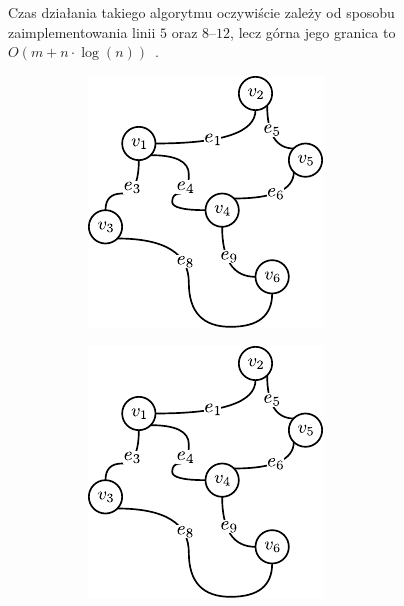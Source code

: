 Czas działania takiego algorytmu oczywiście zależy od sposobu zaimplementowania linii $5$ oraz $8$--$12$, lecz górna jego granica to $O \left( m + n \cdot \log \left( n \right) \right)$~\cite[$522$]{Ahuja:1993:NFT:137406}.

\begin{figure}[!htbp]
	\null\hfill
	\begin{subfigure}[b]{0.24\textwidth}
		\includegraphics[width=\textwidth]{Chapter_I/KRUSKAL-example/a}
		\caption{}
		\label{fig:kruskal:a}
	\end{subfigure}
	\hfill
	\begin{subfigure}[b]{0.24\textwidth}
		\includegraphics[width=\textwidth]{Chapter_I/KRUSKAL-example/a}

\end{subfigure}
\end{figure}
